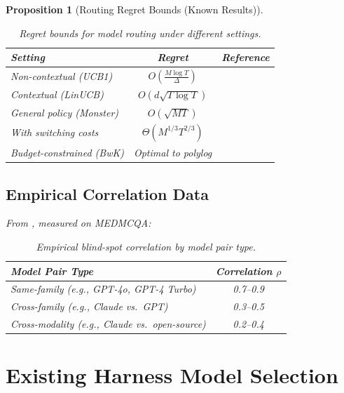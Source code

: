 \documentclass[11pt, a4paper, logo, copyright]{googledeepmind}
\newtheorem{proposition}{Proposition}[section]
\begin{document}
\begin{proposition}[Routing Regret Bounds (Known Results)]
\begin{appendices}
\begin{table}[htbp]
\centering
\begin{tabular}{lcc}
\toprule
\textbf{Setting} & \textbf{Regret} & \textbf{Reference} \\
\midrule
Non-contextual (UCB1) & $O\left(\frac{M \log T}{\Delta}\right)$ & \citet{auer2002} \\
Contextual (LinUCB) & $O(d\sqrt{T \log T})$ & \citet{li2010linucb} \\
General policy (Monster) & $O(\sqrt{MT})$ & \citet{agarwal2014monster} \\
With switching costs & $\Theta(M^{1/3} T^{2/3})$ & \citet{dekel2014switching} \\
Budget-constrained (BwK) & Optimal to polylog & \citet{badanidiyuru2018bwk} \\
\bottomrule
\end{tabular}
\caption{Regret bounds for model routing under different settings.}
\end{table}

\subsection{Empirical Correlation Data}

From \citet{correlatedensemble2026}, measured on MEDMCQA:

\begin{table}[htbp]
\centering
\begin{tabular}{lc}
\toprule
\textbf{Model Pair Type} & \textbf{Correlation $\rho$} \\
\midrule
Same-family (e.g., GPT-4o, GPT-4 Turbo) & 0.7--0.9 \\
Cross-family (e.g., Claude vs.\ GPT) & 0.3--0.5 \\
Cross-modality (e.g., Claude vs.\ open-source) & 0.2--0.4 \\
\bottomrule
\end{tabular}
\caption{Empirical blind-spot correlation by model pair type.}
\end{table}

\section{Existing Harness Model Selection}
\label{app:harnesses}


\end{appendices}
\end{proposition}
\end{document}
